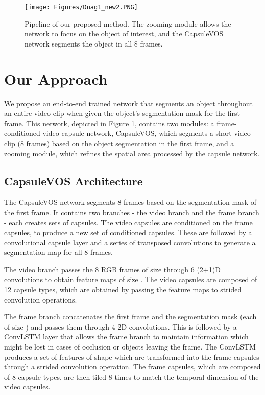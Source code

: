 \documentclass[10pt,twocolumn,letterpaper]{article}
\begin{document}
\begin{figure}[t]
\centering
\texttt{[image: Figures/Duag1\_new2.PNG]}
   \caption{Pipeline of our proposed method. The zooming module allows the network to focus on the object of interest, and the CapsuleVOS network segments the object in all 8 frames.}
\label{fig:network}
\end{figure} 


\section{Our Approach}
We propose an end-to-end trained network that segments an object throughout an entire video clip  when given the object's segmentation mask for the first frame. This network, depicted in Figure \ref{fig:network}, contains two modules: a frame-conditioned video capsule network, CapsuleVOS, which segments a short video clip (8 frames) based on the object segmentation in the first frame, and a zooming module, which refines the spatial area processed by the capsule network.




\subsection{CapsuleVOS Architecture}
The CapsuleVOS network segments 8 frames based on the segmentation mask of the first frame. It contains two branches - the video branch and the frame branch - each creates sets of capsules. The video capsules are conditioned on the frame capsules, to produce a new set of conditioned capsules. These are followed by a convolutional capsule layer and a series of transposed convolutions to generate a segmentation map for all 8 frames.

The video branch passes the 8 RGB frames of size  through 6 (2+1)D convolutions \cite{tran2018closer} to obtain feature maps of size . The video capsules are composed of 12 capsule types, which are obtained by passing the feature maps to strided  convolution operations.

The frame branch concatenates the first frame and the segmentation mask (each of size ) and passes them through 4 2D convolutions. This is followed by a ConvLSTM \cite{xingjian2015convolutional} layer that allows the frame branch to maintain information which might be lost in cases of occlusion or objects leaving the frame. The ConvLSTM produces a set of features of shape  which are transformed into the frame capsules through a strided  convolution operation. The frame capsules, which are composed of 8 capsule types, are then tiled 8 times to match the temporal dimension of the video capsules.
\end{document}
